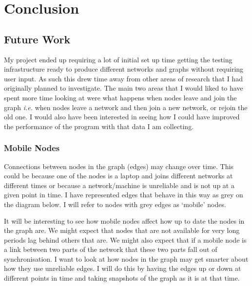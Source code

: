 \documentclass[12pt]{article}
\begin{document}
\section{Conclusion}
\subsection{Future Work}
My project ended up requiring a lot of initial set up
time getting the testing infrastructure ready to
produce different networks and graphs without requiring
user input. As such this drew time away from other
areas of research that I had originally planned to
investigate. The main two areas that I would liked
to have spent more time looking at were what happens
when nodes leave and join the graph \emph{i.e.} when
nodes leave a network and then join a new network, or
rejoin the old one. I would also have been interested
in seeing how I could have improved the performance
of the program with that data I am collecting.

\subsubsection{Mobile Nodes}
\label{sec:mobile}
Connections between nodes in the graph (edges) may
change over time. This could be because one of the nodes
is a laptop and joins different networks at different
times or because a network/machine is unreliable and is
not up at a given point in time. I have represented
edges that behave in this way as grey on the diagram below.
I will refer to nodes with grey edges as `mobile' nodes.

It will be interesting to see how mobile nodes affect how
up to date the nodes in the graph are. We might expect that
nodes that are not available for very long periods lag behind
others that are. We might also expect that if a mobile
node is a link between two parts of the network that
these two parts fall out of synchronisation. I want to look
at how nodes in the graph may get smarter about how
they use unreliable edges. I will do this by having
the edges up or down at different points in time
and taking snapshots of the graph as it is at that time.
\end{document}
